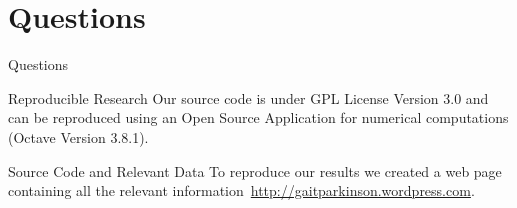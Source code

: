 \documentclass{beamer}
\begin{document}
\section{Questions}
\begin{frame}{Questions}
	\begin{block}{Reproducible Research}
	Our source code is under GPL License Version 3.0 and can be reproduced using an Open Source Application for numerical computations (Octave Version 3.8.1). 
	\end{block}

	\begin{block}{Source Code and Relevant Data}
	To reproduce our results we created a web page containing all the relevant information~\url{http://gaitparkinson.wordpress.com}. 
	\end{block}
\end{frame}



\end{document}

